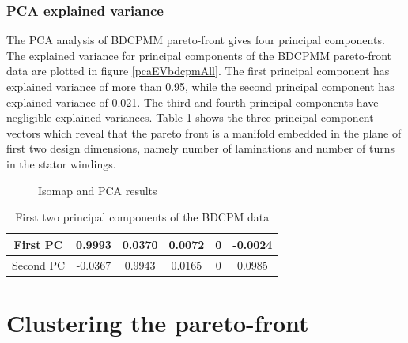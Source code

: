 \subsubsection{PCA explained variance}
The PCA analysis of BDCPMM pareto-front gives four principal 
components.  The explained variance for 
principal components of the BDCPMM pareto-front data are plotted in 
figure \ref{pcaEVbdcpmAll}. The first principal component has 
explained variance of more than 0.95, while the second principal 
component has explained variance of 0.021. The third and fourth 
principal components have negligible explained variances. Table 
\ref{firstTwoPCs} shows the three principal component vectors which 
reveal that the pareto front is a manifold embedded in the plane of 
first two design dimensions, namely number of laminations and number 
of turns in the stator windings.
 
\begin{figure}[ht]\begin{center}
 \caption{Isomap and PCA results}
 \label{bdcpmmVar}
\end{center}\end{figure}

\begin{table}[!ht]
\centering
\begin{tabular}{|c|c|c|c|c|c|}
 \hline
 First PC & 0.9993 & 0.0370 & 0.0072 & 0 & -0.0024\\
 \hline
 Second PC & -0.0367 & 0.9943 & 0.0165 & 0 & 0.0985\\
 \hline
 \end{tabular}
\caption{First two principal components of the BDCPM data}
\label{firstTwoPCs}
\end{table}


\section{Clustering the pareto-front}

